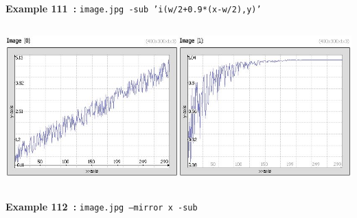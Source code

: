\documentclass[a4paper,11pt,twoside]{book}
\begin{document}
\begin{center}
{\footnotesize \textbf{Example 111~:} \texttt{image.jpg -sub 'i(w/2+0.9*(x-w/2),y)'}}
\\\includegraphics[keepaspectratio=true,height=7cm,width=\textwidth]{img/gmic_def112.jpg}\\
{\footnotesize \textbf{Example 112~:} \texttt{image.jpg --mirror x -sub}}
\end{center}
\end{document}
